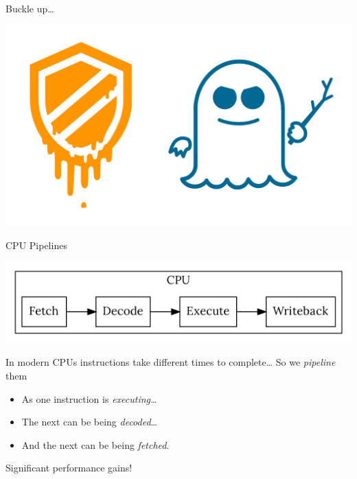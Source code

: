 \documentclass[9pt,aspectratio=169]{beamer}
\begin{document}
\begin{frame}[label={sec:orgfd11c41}]{Buckle up\ldots{}}
\begin{center}
\includegraphics[width=.9\linewidth]{./brandnames.png}
\end{center}
\end{frame}

\begin{frame}[label={sec:orgdd32d17}]{CPU Pipelines}
\begin{center}
\includegraphics[width=.9\linewidth]{pipelines.png}
\end{center}

\begin{block}{In modern CPUs instructions take different times to complete\ldots{}}
So we \emph{pipeline} them
\begin{itemize}
\item As one instruction is \emph{executing\ldots{}}
\item The next can be being \emph{decoded}\ldots{}
\item And the next can be being \emph{fetched}.
\end{itemize}

Significant performance gains!
\end{block}
\end{frame}
\end{document}
